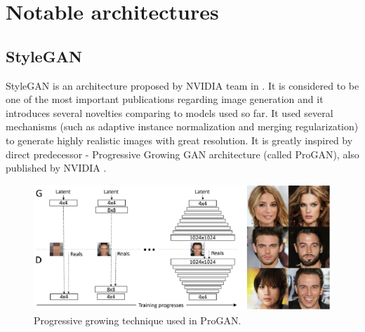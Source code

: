 \documentclass[12pt,a4paper,openany]{book}
\begin{document}


\chapter{Notable architectures}
\section{StyleGAN}

\noindent StyleGAN is an architecture proposed by NVIDIA team in \cite{stylegan}. It is considered to be one of the most important publications regarding image generation and it introduces several novelties comparing to models used so far. It used several mechanisms (such as adaptive instance normalization and merging regularization) to generate highly realistic images with great resolution. It is greatly inspired by direct predecessor - Progressive Growing GAN architecture (called ProGAN), also published by NVIDIA \cite{progan}.

\begin{figure}[ht!]
    \centering
    \includegraphics[scale=1.0]{figs/progan-scheme.eps}
    \caption{Progressive growing technique used in ProGAN.}\label{Fig:PROGAN}
\end{figure}
\end{document}
